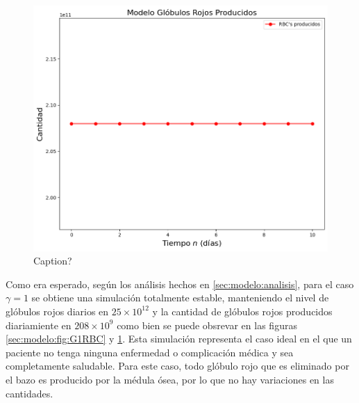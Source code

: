 \begin{figure}[H]
    \centering
    \includegraphics[scale=0.55]{figures/BaseG1SC.png}
    \caption{Caption?}
    \label{sec:modelo:fig:G1SC}
\end{figure}
Como era esperado, según los análisis hechos en \ref{sec:modelo:analisis}, para el caso $\gamma = 1$ se obtiene una simulación totalmente estable, manteniendo el nivel de glóbulos rojos diarios en $25\times 10^{12}$ y la cantidad de glóbulos rojos producidos diariamiente en $208\times 10^{9}$ como bien se puede obsrevar en las figuras \ref{sec:modelo:fig:G1RBC} y \ref{sec:modelo:fig:G1SC}. Esta simulación representa el caso ideal en el que un paciente no tenga ninguna enfermedad o complicación médica y sea completamente saludable. Para este caso, todo glóbulo rojo que es eliminado por el bazo es producido por la médula ósea, por lo que no hay variaciones en las cantidades.

